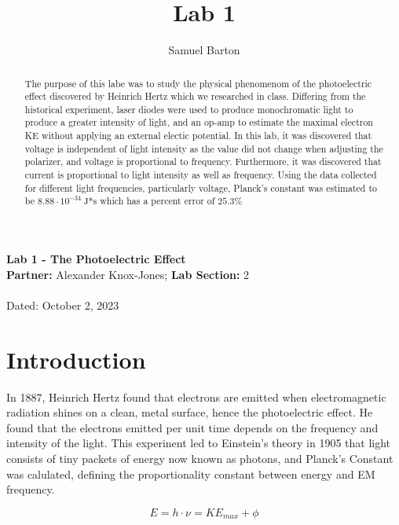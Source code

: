 \documentclass{article}[12pt]
\begin{document}
\title{Lab 1}
\author{Samuel Barton}


\begin{center}
\large{\textbf{Lab 1 - The Photoelectric Effect}}\\
\bigskip
\small{\textbf{Partner:} Alexander Knox-Jones; \textbf{Lab Section:} 2 }\\
~\\
Dated: October 2, 2023\\

\end{center}

\bigskip
\begin{abstract}
  The purpose of this labe was to study the physical phenomenom of the photoelectric effect discovered by Heinrich Hertz which we researched in class.
  Differing from the historical experiment, laser diodes were used to produce monochromatic light to produce a greater intensity of light, and an op-amp to estimate the maximal electron KE without applying an external electic potential.
  In this lab, it was discovered that voltage is independent of light intensity as the value did not change when adjusting the polarizer, and voltage is proportional to frequency. 
  Furthermore, it was discovered that current is proportional to light intensity as well as frequency.
  Using the data collected for different light frequencies, particularly voltage, Planck's constant was estimated to be $ 8.88 \cdot 10^{-34}~\text{J*s} $ which has a percent error of $ 25.3 \% $
\end{abstract}
\bigskip

\section{Introduction}

In 1887, Heinrich Hertz found that electrons are emitted when electromagnetic radiation shines on a clean, metal surface, hence the photoelectric effect.
He found that the electrons emitted per unit time depends on the frequency and intensity of the light.
This experinent led to Einstein's theory in 1905 that light consists of tiny packets of energy now known as photons, and Planck's Constant was calulated, defining the proportionality constant between energy and EM frequency. 

\begin{equation}
E = h \cdot \nu = KE_{max} + \phi 
\label{main_eq}
\end{equation}
\end{document}
